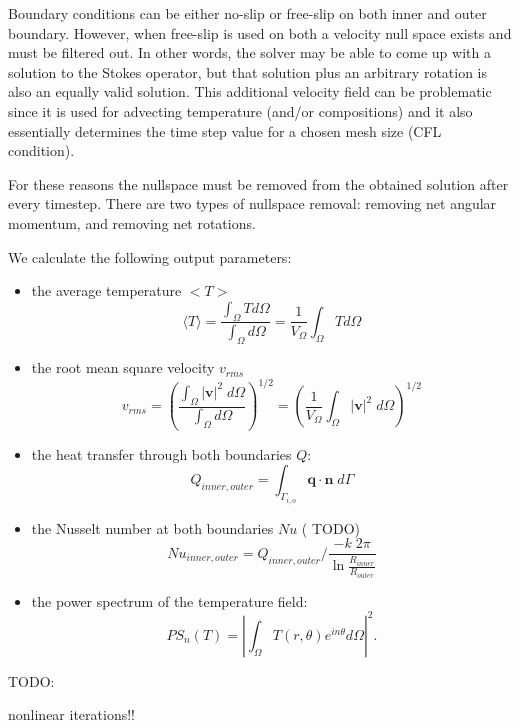 Boundary conditions can be either no-slip or free-slip on both inner and outer boundary. However, when free-slip 
is used on both a velocity null space exists and must be filtered out. In other words,
the solver may be able to come up with a solution to the Stokes operator, but 
that solution plus an arbitrary rotation is also an equally valid solution.
This additional velocity field can be problematic since it is used for advecting temperature (and/or compositions)
and it also essentially determines the time step value for a chosen mesh size (CFL condition).

For these reasons the nullspace must be removed from the obtained solution after every timestep.
There are two types of nullspace removal: removing net angular momentum, and removing net rotations.




We calculate the following output parameters: 
\begin{itemize}
\item the average temperature $<T>$
\begin{equation}
\langle T \rangle = \frac{\int_\Omega T  d\Omega }{\int_\Omega d \Omega }
=\frac{1}{V_\Omega}\int_\Omega T d\Omega
\end{equation}
\item the root mean square velocity $v_{rms}$
\begin{equation}
v_{rms} = \left ( \frac{\int_\Omega |{\bm v}|^2 \;  d \Omega}{\int_\Omega d\Omega }  \right )^{1/2}
=\left ( \frac{1}{V_\Omega} \int_\Omega |{\bm v}|^2 \;  d \Omega \right )^{1/2}
\end{equation}
\item the heat transfer through both boundaries $Q$:
\begin{equation}
Q_{inner, outer} = \int_{\Gamma_{i,o}} \boldsymbol{q} \cdot \boldsymbol{{n}} \; d\Gamma 
\end{equation}
\item the Nusselt number at both boundaries $Nu$  ({\color{red} TODO}) 
\begin{equation}
Nu_{inner, outer} = Q_{inner, outer} \bigg / \frac{-k \; 2 \pi}{\ln{\frac{R_{inner}}{R_{outer}}}}
\end{equation}
\item the power spectrum of the temperature field:
\begin{equation}
PS_n(T) = \left |\int_\Omega T(r, \theta) e^{in\theta} d\Omega \right |^2.
\end{equation}
\end{itemize}







TODO:

nonlinear iterations!!
